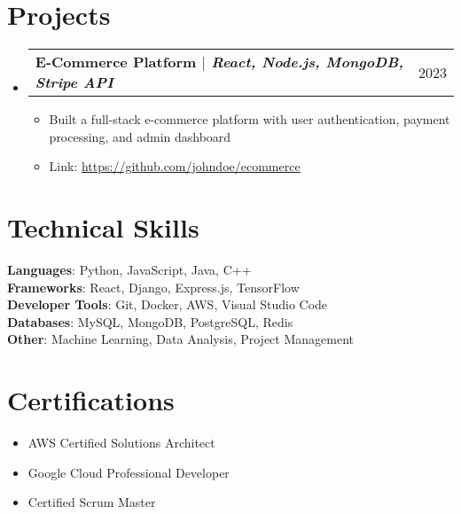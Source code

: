 \documentclass[letterpaper,11pt]{article}
\makeatletter
\newcommand{\resumeItem}[1]{
  \item\small{
    {#1 \vspace{-2pt}}
  }
}
\newcommand{\resumeProjectHeading}[2]{
    \item
    \begin{tabular*}{0.97\textwidth}{l@{\extracolsep{\fill}}r}
      \small#1 & #2 \\
    \end{tabular*}\vspace{-7pt}
}
\newcommand{\resumeSubHeadingListStart}{\begin{itemize}[leftmargin=0.15in, label={}]}
\newcommand{\resumeSubHeadingListEnd}{\end{itemize}}
\newcommand{\resumeItemListStart}{\begin{itemize}}
\newcommand{\resumeItemListEnd}{\end{itemize}\vspace{-5pt}}
\makeatother
\begin{document}
\section{Projects}
    \resumeSubHeadingListStart
      \resumeProjectHeading
          {\textbf{E-Commerce Platform $|$ \emph{React, Node.js, MongoDB, Stripe API}}}{2023}
          \resumeItemListStart
            \resumeItem{Built a full-stack e-commerce platform with user authentication, payment processing, and admin dashboard}
            \resumeItem{Link: \href{https://github.com/johndoe/ecommerce}{\underline{https://github.com/johndoe/ecommerce}}}
          \resumeItemListEnd
    \resumeSubHeadingListEnd

\section{Technical Skills}
 \begin{itemize}[leftmargin=0.15in, label={}]
    \small{\item{
     \textbf{Languages}: Python, JavaScript, Java, C++ \\
     \textbf{Frameworks}: React, Django, Express.js, TensorFlow \\
     \textbf{Developer Tools}: Git, Docker, AWS, Visual Studio Code \\
     \textbf{Databases}: MySQL, MongoDB, PostgreSQL, Redis \\
     \textbf{Other}: Machine Learning, Data Analysis, Project Management
    }}
 \end{itemize}

\section{Certifications}
  \resumeItemListStart
    \resumeItem{\textbullet AWS Certified Solutions Architect}
    \resumeItem{\textbullet Google Cloud Professional Developer}
    \resumeItem{\textbullet Certified Scrum Master}
  \resumeItemListEnd

\end{document}
